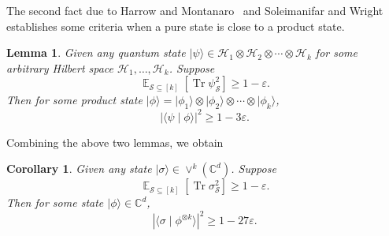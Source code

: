 \documentclass[10pt,a4paper]{article}
\newtheorem{lemma}[theorem]{Lemma}
\newtheorem{corollary}[theorem]{Corollary}
\theoremstyle{remark}
\def\eps{\varepsilon}
\def\epsilon{\varepsilon}
\def\eps{\epsilon}
\newcommand{\C}{{\mathbb C}}
\newcommand{\cH}{\mathcal{H}}
\newcommand{\cS}{\mathcal{S}}
\newcommand{\1}[1]{\mathds{1}{[#1]}}
\newcommand{\ket}[1]{\lvert #1\rangle}
\newcommand{\Symm}[2]{\vee^{#1}(\C^{#2})}
\DeclareMathOperator*{\Exp}{\mathbb{E}}
\newcommand{\trace}{\operatorname{Tr}}
\numberwithin{equation}{section}
\begin{document}
The second fact  due to  Harrow and Montanaro~\cite[Appendix~B~Lemma~2]{HM13} and Soleimanifar and Wright~\cite{SW22matrix-product} establishes some criteria when a pure state is close to a product state.
\begin{lemma}
Given any quantum state $\ket\psi\in \cH_1 \otimes \cH_2 \otimes \cdots \otimes \cH_k$ for some arbitrary Hilbert space $\cH_1, \ldots, \cH_k$. Suppose 
\[
    \Exp_{\cS\subseteq [k]} [\trace{\psi_\cS^2}] \ge 1-\epsilon.
\]
Then for some product state $\ket\phi=\ket{\phi_1}\otimes\ket{\phi_2}\otimes\cdots\otimes\ket{\phi_k}$,
\[
    |\langle\psi \mid \phi\rangle|^2 \ge 1-3\epsilon.
\]
\end{lemma}

Combining the above two lemmas, we obtain
\begin{corollary}\label{cor:sym-prod}
Given any  state $\ket\sigma \in \Symm{k}{d}$. Suppose 
\[
    \Exp_{\cS\subseteq [k]} [\trace{\sigma_\cS^2}] \ge 1-\epsilon.
\]
Then for some  state $\ket\phi \in \C^d$,
\[
    |\langle\sigma \mid \phi^{\otimes k}\rangle|^2 \ge 1-27\epsilon.
\]
\end{corollary}
\end{document}
